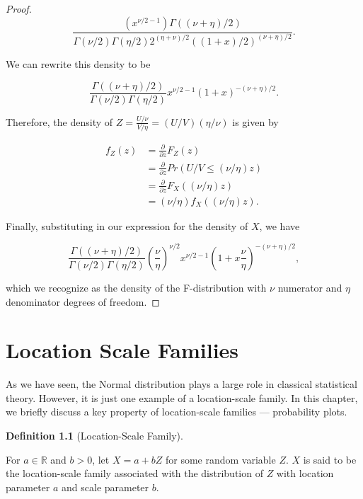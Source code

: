 \documentclass[
  letterpaper,
  DIV=11,
  numbers=noendperiod]{scrreprt}
\theoremstyle{definition}
\newtheorem{definition}{Definition}[chapter]
\theoremstyle{definition}
\theoremstyle{plain}
\theoremstyle{remark}
\begin{document}
\begin{proof}
\[\frac{\left(x^{\nu/2 - 1}\right) \Gamma((\nu+\eta)/2)}{\Gamma(\nu/2)\Gamma(\eta/2) 2^{(\eta + \nu)/2} ((1+x)/2)^{(\nu + \eta)/2}}.\]

We can rewrite this density to be

\[\frac{\Gamma((\nu + \eta)/2)}{\Gamma(\nu/2)\Gamma(\eta/2)} x^{\nu/2 - 1} \left(1 + x\right)^{-(\nu + \eta)/2}.\]

Therefore, the density of \(Z = \frac{U/\nu}{V/\eta} = (U/V)(\eta/\nu)\)
is given by

\[
\begin{aligned}
  f_Z(z)
    &= \frac{\partial}{\partial z} F_Z(z) \\
    &= \frac{\partial}{\partial z} Pr(U/V \leq (\nu/\eta) z) \\
    &= \frac{\partial}{\partial z} F_X((\nu/\eta) z) \\
    &= (\nu/\eta) f_X((\nu/\eta) z).
\end{aligned}
\]

Finally, substituting in our expression for the density of \(X\), we
have

\[\frac{\Gamma((\nu + \eta)/2)}{\Gamma(\nu/2)\Gamma(\eta/2)} \left(\frac{\nu}{\eta}\right)^{\nu/2} x^{\nu/2 - 1} \left(1 + x\frac{\nu}{\eta}\right)^{-(\nu + \eta)/2},\]

which we recognize as the density of the F-distribution with \(\nu\)
numerator and \(\eta\) denominator degrees of freedom.

\end{proof}


\hypertarget{sec-location-scale}{%
\chapter{Location Scale Families}\label{sec-location-scale}}

As we have seen, the Normal distribution plays a large role in classical
statistical theory. However, it is just one example of a location-scale
family. In this chapter, we briefly discuss a key property of
location-scale families --- probability plots.

\begin{definition}[Location-Scale
Family]\protect\hypertarget{def-location-scale}{}\label{def-location-scale}

For \(a \in \mathbb{R}\) and \(b > 0\), let \(X = a + bZ\) for some
random variable \(Z\). \(X\) is said to be the location-scale family
associated with the distribution of \(Z\) with location parameter \(a\)
and scale parameter \(b\).

\end{definition}
\end{document}
